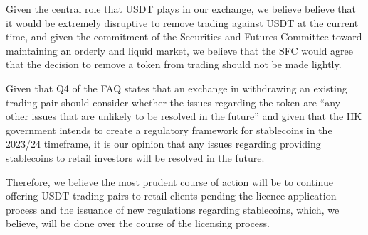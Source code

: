 Given the central role that USDT plays in our exchange, we believe
believe that it would be extremely disruptive to remove trading
against USDT at the current time, and given the commitment of the
Securities and Futures Committee toward maintaining an orderly and
liquid market, we believe that the SFC would agree that the decision
to remove a token from trading should not be made lightly.

Given that Q4 of the FAQ states that an exchange in withdrawing an
existing trading pair should consider whether the issues
regarding the token are ``any other issues that are unlikely to be
resolved in the future'' and given that the HK government intends to
create a regulatory framework for stablecoins in the 2023/24
timeframe, it is our opinion that any issues regarding providing
stablecoins to retail investors will be resolved in the future.

Therefore, we believe the most prudent course of action will be to
continue offering USDT trading pairs to retail clients pending the
licence application process and the issuance of new regulations
regarding stablecoins, which, we believe, will be done over the course
of the licensing process.







